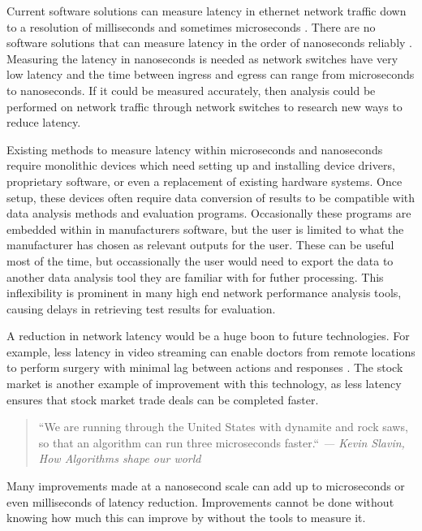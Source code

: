 \par Current software solutions can measure latency in ethernet network traffic down to a resolution of
milliseconds and sometimes microseconds \cite{pingisbad}. There are no software solutions that can measure
latency in the order of nanoseconds reliably \cite{timeinlinux}. Measuring the latency in nanoseconds is needed as
network switches have very low latency and the time between ingress and egress can range from
microseconds to nanoseconds. If it could be measured accurately, then analysis could be performed
on network traffic through network switches to research new ways to reduce latency.

\par Existing methods to measure latency within microseconds and nanoseconds require monolithic devices which need 
setting up and installing device drivers, proprietary software, or even a replacement of existing hardware systems.
Once setup, these devices often require data conversion of results to be compatible with data analysis methods and 
evaluation programs. Occasionally these programs are embedded within in manufacturers software, but the user is 
limited to what the manufacturer has chosen as relevant outputs for the user. These can be useful most of the time, 
but occassionally the user would need to export the data to another data analysis tool they are familiar with for 
futher processing. This inflexibility is prominent in many high end network performance analysis tools, causing 
delays in retrieving test results for evaluation.

\par A reduction in network latency would be a huge boon to future technologies. For example, less
latency in video streaming can enable doctors from remote locations to perform surgery with
minimal lag between actions and responses \cite{remotesurgery}. The stock market is another example of improvement with
this technology, as less latency ensures that stock market trade deals can be completed faster.

\begin{quote}
    \centering
    ``We are running through the United States with dynamite and rock saws, so that an algorithm can
    run three microseconds faster.`` \em --- Kevin Slavin, How Algorithms shape our world \cite{tedTalkAlgorithms}
\end{quote} 

\par Many improvements made at a nanosecond scale can add up to microseconds or even milliseconds of latency
reduction. Improvements cannot be done without knowing how much this can improve by without the tools to measure it.

